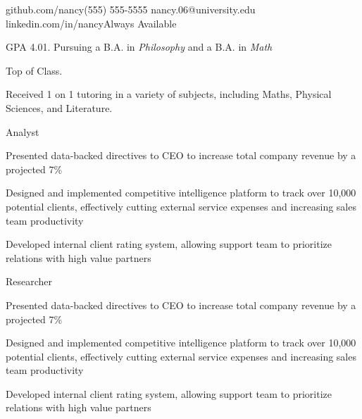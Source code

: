 \documentclass{practical-resume}
\begin{document}
\namehead

\address{nancy.com}{github.com/nancy}{(555) 555-5555}{ nancy.06@university.edu }{linkedin.com/in/nancy}{Always Available}


	\begin{position}{}{}
		\item GPA 4.01. Pursuing a B.A. in \textit{Philosophy} and a B.A. in \textit{Math}
		\item Top of Class.
	\end{position}

	\begin{position}{}{}
	\item Received 1 on 1 tutoring in a variety of subjects, including Maths, Physical Sciences, and Literature.
	\end{position}


	\begin{position}{Analyst}{}
		\item Presented data-backed directives to CEO to increase total company revenue by a projected 7\%
		\item Designed and implemented competitive intelligence platform to track over 10,000 potential clients, effectively cutting external service expenses and increasing sales team productivity
		\item Developed internal client rating system, allowing support team to prioritize relations with high value partners
		
	\end{position}

	\begin{position}{Researcher}{}
		\item Presented data-backed directives to CEO to increase total company revenue by a projected 7\%
		\item Designed and implemented competitive intelligence platform to track over 10,000 potential clients, effectively cutting external service expenses and increasing sales team productivity
		\item Developed internal client rating system, allowing support team to prioritize relations with high value partners
		
	\end{position}
	
\end{document}
